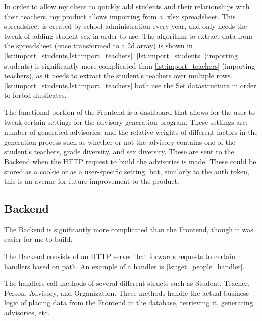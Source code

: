 \documentclass[advisory-ia.tex]{subfiles}
\begin{document}
  In order to allow my client to quickly add students and their relationships with their teachers, my product allows importing from a .xlsx spreadsheet.
  This spreadsheet is created by school administration every year, and only needs the tweak of adding student sex in order to use.
  The algorithm to extract data from the spreadsheet (once transformed to a 2d array) is shown in \cref{lst:import_students,lst:import_teachers}.
  \cref{lst:import_students} (importing students) is significantly more complicated than \cref{lst:import_teachers} (importing teachers), as it needs to extract the student's teachers over multiple rows.
  \cref{lst:import_students,lst:import_teachers} both use the Set datastructure in order to forbid duplicates.

  

  

  The functional portion of the Frontend is a dashboard that allows for the user to tweak certain settings for the advisory generation program.
  These settings are: number of generated advisories, and the relative weights of different factors in the generation process such as whether or not the advisory contains one of the student's teachers, grade diversity, and sex diversity.
  These are sent to the Backend when the HTTP request to build the advisories is made.
  These could be stored as a cookie or as a user-specific setting, but, similarly to the auth token, this is an avenue for future improvement to the product.

  \subsection{Backend}
  \label{subsec:Backend}
  The Backend is significantly more complicated than the Frontend, though it was easier for me to build.

  The Backend consists of an HTTP server that forwards requests to certain handlers based on path.
  An example of a handler is \cref{lst:get_people_handler}.

  

  The handlers call methods of several different structs such as Student, Teacher, Person, Advisory, and Organization.
  These methods handle the actual business logic of placing data from the Frontend in the database, retrieving it, generating advisories, etc.
\end{document}
